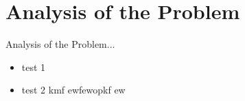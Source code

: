 \chapter{Analysis of the Problem}
\label{Analysis of the Problem}
Analysis of the Problem...
\begin{itemize}
	\item test 1
	\item test 2 kmf ewfewopkf ew
\end{itemize}
